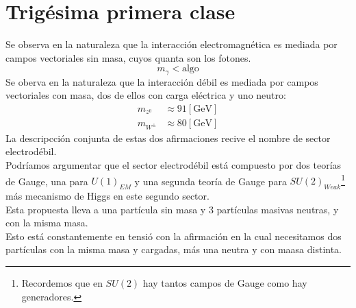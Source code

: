 \documentclass[../main.tex]{subfiles}
\begin{document}
\section{Trigésima primera clase}
Se observa en la naturaleza que la interacción electromagnética es mediada por campos vectoriales sin masa, cuyos quanta son los fotones.
\begin{equation}
  m_{\gamma}< \text{algo} 
 \end{equation}
Se oberva en la naturaleza que la interacción débil es mediada por campos vectoriales con masa, dos de ellos con carga eléctrica y uno neutro:
\begin{align}
  m_{z^0}& \approx 91 [\text{GeV}] \\
  m_{W^{\pm}}& \approx 80 [\text{GeV}]
\end{align}
La descripcción conjunta de estas dos afirmaciones recive el nombre de sector electrodébil. \\
Podríamos argumentar que el sector electrodébil está compuesto por dos teorías de Gauge, una para $U(1)_{EM}$ y una segunda teoría de Gauge para $SU(2)_{Weak}$\footnote{Recordemos que en $SU(2)$ hay tantos campos de Gauge como hay generadores. } más mecanismo de Higgs en este segundo sector. 
\\
Esta propuesta lleva a una partícula sin masa y 3 partículas masivas neutras, y con la misma masa. \\
Esto está constantemente en tensió con la afirmación en la cual necesitamos dos partículas con la misma masa y cargadas, más una neutra y con maasa distinta.
\end{document}
